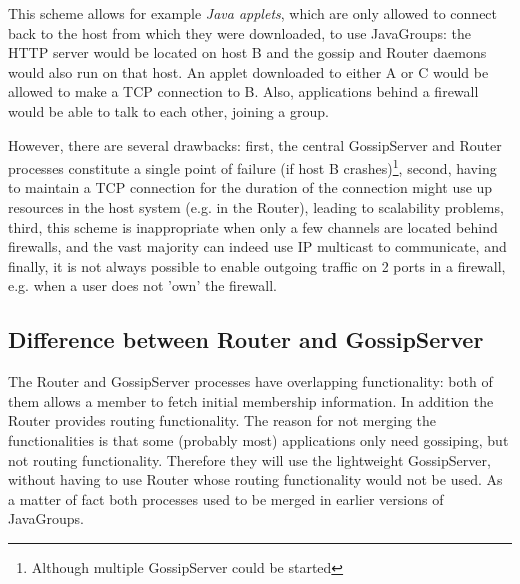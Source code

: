       This scheme allows for example {\em Java applets}, which are only allowed to
      connect back to the host from which they were downloaded, to use JavaGroups:
      the HTTP server would be located on host B and the gossip and Router daemons
      would also run on that host. An applet downloaded to either A or C would be
      allowed to make a TCP connection to B. Also, applications behind a firewall
      would be able to talk to each other, joining a group.

      However, there are several drawbacks: first, the central GossipServer and Router
      processes constitute a single point of failure (if host B
      crashes)\footnote{Although multiple GossipServer could be started}, second,
      having to maintain a TCP connection for the duration of the connection might
      use up resources in the host system (e.g. in the Router), leading to
      scalability problems, third, this scheme is inappropriate when only a few
      channels are located behind firewalls, and the vast majority can indeed use IP
      multicast to communicate, and finally, it is not always possible to enable
      outgoing traffic on 2 ports in a firewall, e.g. when a user does not 'own' the
      firewall.


    \subsection{Difference between Router and GossipServer}
    
    The Router and GossipServer processes have overlapping functionality: both of
    them allows a member to fetch initial membership information. In addition the
    Router provides routing functionality. The reason for not merging the
    functionalities is that some (probably most) applications only need gossiping,
    but not routing functionality. Therefore they will use the lightweight
    GossipServer, without having to use Router whose routing functionality would not
    be used. As a matter of fact both processes used to be merged in earlier versions
    of JavaGroups.



